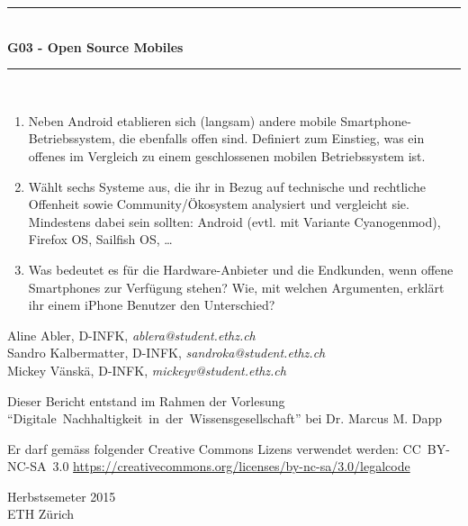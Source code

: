 \begin{titlepage}

\thispagestyle{plain}
\fancyhead{}
\fancyfoot{}

\begin{center}
\vspace{3.5cm}
\rule{\linewidth}{0.5mm} \\[0.4cm]
\textbf{\huge G03 - Open Source Mobiles} \\
\rule{\linewidth}{0.5mm} \\
\vspace{3\baselineskip}
\end{center}
\begin{large}
\begin{enumerate}
    \item Neben Android etablieren sich (langsam) andere mobile Smartphone-Betriebssystem, die ebenfalls offen sind. Definiert zum Einstieg, was ein offenes im Vergleich zu einem geschlossenen mobilen Betriebssystem ist.

    \item Wählt sechs Systeme aus, die ihr in Bezug auf technische und rechtliche Offenheit sowie Community/Ökosystem analysiert und vergleicht sie. Mindestens dabei sein sollten: Android (evtl. mit Variante Cyanogenmod), Firefox OS, Sailfish OS, …

    \item Was bedeutet es für die Hardware-Anbieter und die Endkunden, wenn offene Smartphones zur Verfügung stehen? Wie, mit welchen Argumenten, erklärt ihr einem iPhone Benutzer den Unterschied?
\end{enumerate}

\begin{center}
\vfill

 Aline Abler, \textsc{D-INFK}, \emph{ablera@student.ethz.ch} \\
Sandro Kalbermatter, \textsc{D-INFK}, \emph{sandroka@student.ethz.ch} \\
Mickey Vänskä, \textsc{D-INFK}, \emph{mickeyv@student.ethz.ch} \\
\vspace{2\baselineskip}

Dieser Bericht entstand im Rahmen der Vorlesung \mbox{``Digitale Nachhaltigkeit in der Wissensgesellschaft''} bei Dr{.} Marcus M{.} Dapp \\
\vspace{2\baselineskip}

Er darf gemäss folgender Creative Commons Lizens verwendet werden: \mbox{CC BY-NC-SA 3.0} \url{https://creativecommons.org/licenses/by-nc-sa/3.0/legalcode} \\
\vfill

Herbstsemeter 2015 \\
\vspace{0.5\baselineskip}
ETH Zürich

\end{center}
\end{large}

\end{titlepage}
